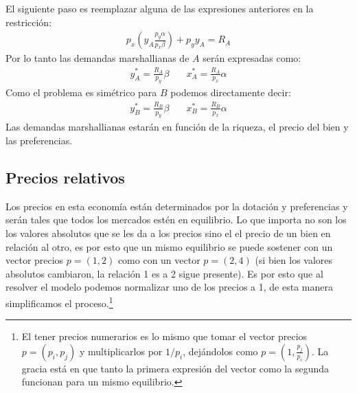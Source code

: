El siguiente paso es reemplazar alguna de las expresiones anteriores en la restricción:
\begin{align*}
    p_x\left( y_A\frac{p_y\alpha}{p_x\beta} \right) + p_yy_A = R_A
\end{align*}
Por lo tanto las demandas marshallianas de $A$ serán expresadas como:
\begin{align*}
    y_A^* = \frac{R_A}{p_y} \beta & \quad  x_A^* = \frac{R_A}{p_x} \alpha
\end{align*}
Como el problema es simétrico para $B$ podemos directamente decir:
\begin{align*}
    y_B^* = \frac{R_B}{p_y} \beta & \quad  x_B^* = \frac{R_B}{p_x} \alpha
\end{align*}
Las demandas marshallianas estarán en función de la riqueza, el precio del bien y las preferencias.

\subsection{Precios relativos}

Los precios en esta economía están determinados por la dotación y preferencias y serán tales que todos los mercados estén en equilibrio. Lo que importa no son los los valores absolutos que se les da a los precios sino el el precio de un bien en relación al otro, es por esto que un mismo equilibrio se puede sostener con un vector precios $p=(1,2)$ como con un vector $p=(2,4)$ (si bien los valores absolutos cambiaron, la relación 1 es a 2 sigue presente). Es por esto que al resolver el modelo podemos normalizar uno de los precios a 1, de esta manera  simplificamos el proceso.\footnote{El tener precios numerarios es lo mismo que tomar el vector precios $p = (p_i,p_j)$ y multiplicarlos por $1/p_i$, dejándolos como $p = (1, \frac{p_j}{p_i})$. La gracia está en que tanto la primera expresión del vector como la segunda funcionan para un mismo equilibrio.} 

